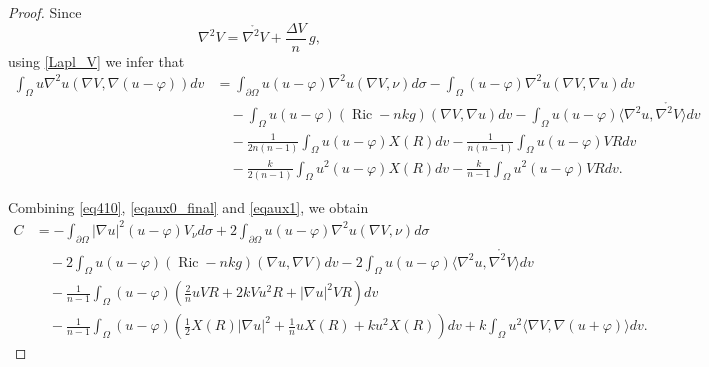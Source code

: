 \documentclass[reqno,11pt]{amsart}
\numberwithin{equation}{section}  %
\begin{document}
\begin{proof}
Since
\[
\nabla^{2}V
=
\mathring{\nabla^{2}V}
+
\frac{\Delta V}{n}\,g,
\]
using \eqref{Lapl_V} we infer that
\begin{align}\label{eqaux1}
\int_{\Omega}u\nabla^{2}u(\nabla V,\nabla(u-\varphi))dv
&=
\int_{\partial\Omega}u(u-\varphi)\nabla^{2}u(\nabla V,\nu)d\sigma
-
\int_{\Omega}(u-\varphi)\nabla^{2}u(\nabla V,\nabla u) dv
\nonumber\\
&\quad
-
\int_{\Omega}u(u-\varphi)(\operatorname{Ric}-nkg)(\nabla V,\nabla u) dv
-
\int_{\Omega}u(u-\varphi)
\langle\nabla^{2}u,\mathring{\nabla^{2}V}\rangle dv
\nonumber\\
&\quad
-
\frac{1}{2n(n-1)}
\int_{\Omega}u(u-\varphi)X(R) dv
-
\frac{1}{n(n-1)}
\int_{\Omega}u(u-\varphi)VR dv
\nonumber\\
&\quad
-
\frac{k}{2(n-1)}
\int_{\Omega}u^{2}(u-\varphi)X(R) dv
-
\frac{k}{n-1}
\int_{\Omega}u^{2}(u-\varphi)VR dv.
\end{align}

Combining \eqref{eq410}, \eqref{eqaux0_final} and \eqref{eqaux1}, we obtain
\begin{align*}
C
&=
-\int_{\partial\Omega}|\nabla u|^{2}(u-\varphi)V_{\nu}d\sigma
+2\int_{\partial\Omega}u(u-\varphi)\nabla^{2}u(\nabla V,\nu)d\sigma
\nonumber\\
&\quad
-2\int_{\Omega}u(u-\varphi)(\operatorname{Ric}-nkg)(\nabla u,\nabla V)dv
-2\int_{\Omega}u(u-\varphi)\langle\nabla^{2}u,\mathring{\nabla^{2}V}\rangle dv
\nonumber\\
&\quad
-\frac{1}{n-1}\int_{\Omega}(u-\varphi)
\left(
\frac{2}{n}uVR
+2kVu^{2}R
+|\nabla u|^{2}VR
\right)dv
\nonumber\\
&\quad
-\frac{1}{n-1}\int_{\Omega}(u-\varphi)
\left(
\frac12 X(R)|\nabla u|^{2}
+\frac{1}{n}uX(R)
+ku^{2}X(R)
\right)dv
+k\int_{\Omega}u^{2}\langle\nabla V,\nabla(u+\varphi)\rangle dv.
\end{align*}


\end{proof}
\end{document}
